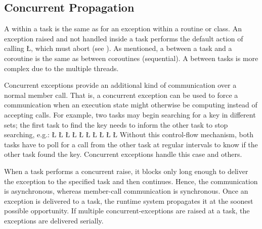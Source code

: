 \documentclass[openright,twoside]{report}
\begin{document}
\subsection{Concurrent Propagation}
\label{s:ConcurrentPropagation}

A  within a task is the same as for an exception within a routine or class.
An exception raised and not handled inside a task performs the \CC default action of calling \LGinlinetrue\LGbegin\lgrinde\L{}\endlgrinde\LGend{}, which must abort (see ).
As mentioned, a  between a task and a coroutine is the same as between coroutines (sequential).
A  between tasks is more complex due to the multiple threads.

Concurrent exceptions provide an additional kind of communication over a normal member call.
That is, a concurrent exception can be used to force a communication when an execution state might otherwise be computing instead of accepting calls.
For example, two tasks may begin searching for a key in different sets;
the first task to find the key needs to inform the other task to stop searching, e.g.:
\LGinlinefalse\LGbegin\lgrinde
\L{}
\L{\LB{}}
\CE{}\L{\LB{}}
\L{\LB{}}
\L{\LB{}}
\L{\LB{}}
\CE{}\L{\LB{}}
\L{\LB{}}
\CE{}\L{\LB{}}
\L{\LB{}}
\endlgrinde\LGend
Without this control-flow mechanism, both tasks have to poll for a call from the other task at regular intervals to know if the other task found the key.
Concurrent exceptions handle this case and others.

When a task performs a concurrent raise, it blocks only long enough to deliver the exception to the specified task and then continues.
Hence, the communication is asynchronous, whereas member-call communication is synchronous.
Once an exception is delivered to a task, the runtime system propagates it at the soonest possible opportunity.
If multiple concurrent-exceptions are raised at a task, the exceptions are delivered serially.
\end{document}
